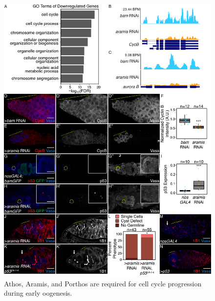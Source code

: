 \documentclass[12pt,oneside]{reedthesis}
\begin{document}
\begin{figure}

{\centering \includegraphics[width=6.5 in,height=8.9375 in]{./figure/Ribosome Biogenesis/Ribosome Biogenesis 3} 

}

\caption[Athos, Aramis, and Porthos are required for cell cycle progression during early oogenesis.]{Athos, Aramis, and Porthos are required for cell cycle progression during early oogenesis.}\label{fig:unnamed-chunk-10}
\end{figure}
\end{document}
